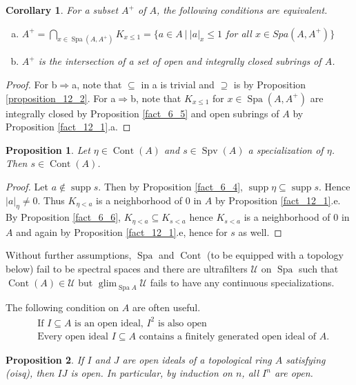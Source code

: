 \documentclass[8pt]{article}
\numberwithin{equation}{section}
\newtheorem{proposition}{Proposition}[subsection]
\newtheorem{corollary}{Corollary} [subsection]
\DeclareMathOperator{\supp}{supp}
\DeclareMathOperator{\Spa}{Spa}
\DeclareMathOperator{\glim}{glim}
\DeclareMathOperator{\Spv}{Spv}
\DeclareMathOperator{\Cont}{Cont}
\newcommand{\U}[0]{\mathcal{U}}
\newcommand{\sep}[0]{\:|\:}
\newcommand{\ab}[1]{\vert #1 \vert}
\begin{document}
\begin{corollary}
    \label{corollary_12_1}
    For a subset $A^+$ of $A$, the following conditions are equivalent.
    \begin{enumerate}[a.]
        \item $A^+ = \bigcap_{x\in\Spa(A,A^+)} K_{x\leq 1} = \{a\in A\sep \ab{a}_x\leq 1$ for all $x\in Spa(A,A^+)\}$
        \item $A^+$ is the intersection of a set of open and integrally closed subrings of $A$.
    \end{enumerate}
\end{corollary}
\begin{proof}
    For b$\Rightarrow$a, note that $\subseteq $ in a is trivial and $\supseteq$ is by Proposition \ref{proposition_12_2}. For a$\Rightarrow$b, note that $K_{x\leq1}$ for $x\in\Spa(A,A^+)$ are integrally closed by Proposition \ref{fact_6_5} and open subrings of $A$ by Proposition \ref{fact_12_1}.a.
\end{proof}
\begin{proposition}
    \label{fact_13_5}
    Let $\eta\in\Cont(A)$ and $s\in\Spv(A)$ a specialization of $\eta$. Then $s\in\Cont(A)$.
\end{proposition}
\begin{proof}
    Let $a\not\in\supp s$. Then by Proposition \ref{fact_6_4}, $\supp\eta\subseteq\supp s$. Hence $\ab{a}_{\eta}\not=0$. Thus $K_{\eta<a}$ is a neighborhood of $0$ in $A$ by Proposition \ref{fact_12_1}.e. By Proposition \ref{fact_6_6}, $K_{\eta<a}\subseteq K_{s<a}$ hence $K_{s<a}$ is a neighborhood of $0$ in $A$ and again by Proposition \ref{fact_12_1}.e, hence for $s$ as well.
\end{proof}
Without further assumptions, $\Spa$ and $\Cont$ (to be equipped with a topology below) fail to be spectral spaces and there are ultrafilters $\U$ on $\Spa$ such that $\Cont(A)\in\U$ but $\glim_{\Spa A}\U$ fails to have any continuous specializations.
\par The following condition on $A$ are often useful.
\begin{align*}
    &\text{If $I\subseteq A$ is an open ideal, $I^2$ is also open} \tag{oisq}\\
    &\text{Every open ideal $I\subseteq A$ contains a finitely generated open ideal of $A$.}\tag{oifin}
\end{align*}
\begin{proposition}
    \label{fact_13_6}
    If $I$ and $J$ are open ideals of a topological ring $A$ satisfying (oisq), then $IJ$ is open. In particular, by induction on $n$, all $I^n$ are open.
\end{proposition}
\end{document}

